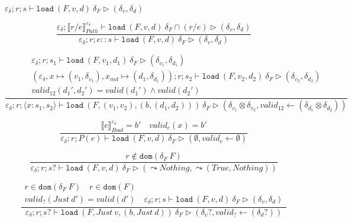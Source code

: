\documentclass{report}
\theoremstyle{theorem}
\begin{document}
$\boxed{\varepsilon_\delta ; r ; s \vdash \mathtt{load}~ (F,v,d)~ \delta_F \rhd (\delta_v,\delta_d)}$

\begin{displaymath}
	\frac{\varepsilon_\delta ; \llbracket r/e \rrbracket^{\varepsilon_\delta}_{Path} \vdash \mathtt{load}~ (F,v,d)~ \delta_F \cap (r/e) \rhd (\delta_v,\delta_d)}
	{\varepsilon_\delta ; r ; e::s \vdash \mathtt{load}~ (F,v,d)~ \delta_F \rhd (\delta_v,\delta_d)}
\end{displaymath}

\begin{displaymath}
	\frac{\begin{array}{c}
		\varepsilon_\delta ; r ; s_1 \vdash \mathtt{load}~ (F,v_1,d_1)~ \delta_F \rhd (\delta_{v_1},\delta_{d_1})\\
		(\varepsilon_\delta,x \mapsto (v_1,\delta_{v_1}),x_{md} \mapsto (d_1,\delta_{d_1})) ; r ; s_2 \vdash \mathtt{load}~ (F,v_2,d_2)~ \delta_F \rhd (\delta_{v_2},\delta_{d_2})\\
		valid_{12}({d_1}',{d_2}') = valid({d_1}') \wedge valid({d_2}')
	\end{array}}
	{\varepsilon_\delta ; r ; \langle x:s_1,s_2 \rangle \vdash \mathtt{load}~ (F,(v_1,v_2),(b,(d_1,d_2)))~ \delta_F \rhd (\delta_{v_1} \otimes \delta_{v_2},valid_{12} \leftarrow (\delta_{d_1} \otimes \delta_{d_2})) }
\end{displaymath}

\begin{displaymath}
	\frac{\llbracket e \rrbracket^{\varepsilon_\delta}_{Bool} = b' \quad valid_e(x) = b'}
	{\varepsilon_\delta ; r ; P(e) \vdash \mathtt{load}~ (F,v,d)~ \delta_F \rhd (\emptyset,valid_e \leftarrow \emptyset)}
\end{displaymath}

\begin{displaymath}
	\frac{r \notin \mathtt{dom}(\delta_F~F)}
	{\varepsilon_\delta ; r ; s? \vdash \mathtt{load}~ (F,v,d)~ \delta_F \rhd (\leadsto Nothing,\leadsto (True,Nothing))}
\end{displaymath}

\begin{displaymath}
	\frac{\begin{array}{c}
		r \in \mathtt{dom}(\delta_F~F) \quad r \in \mathtt{dom}(F)\\
		valid_?(Just~d') = valid(d')\quad
		\varepsilon_\delta ; r ; s \vdash \mathtt{load}~ (F,v,d)~ \delta_F \rhd (\delta_v,\delta_d)
	\end{array}}
	{\varepsilon_\delta ; r ; s? \vdash \mathtt{load}~ (F,Just ~v,(b,Just ~d))~ \delta_F \rhd (\delta_v?,valid_? \leftarrow (\delta_d?))}
\end{displaymath}
\end{document}
